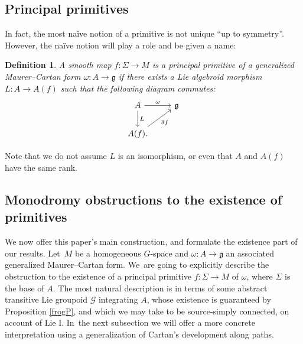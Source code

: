 \documentclass[pdftex]{sigma}%
\numberwithin{equation}{section}
\newtheorem{Definition}[Theorem]{Definition}
\begin{document}
\subsection*{Principal primitives}

In fact, the most na\"ive notion of a primitive is not unique ``up to
symmetry''. However, the na\"ive notion will play a role and be given a
name:
\begin{Definition}
 A smooth map $f \colon \Sigma \rightarrow M$ is a {\it principal
 primitive} of a generalized Maurer--Cartan form
 $\omega \colon A \rightarrow {\mathfrak g} $ if there exists a Lie
 algebroid morphism $L \colon A \rightarrow A(f)$ such that the
 following diagram commutes:
 \begin{equation}
 \begin{tikzcd} A \arrow{d}{L} \arrow{r}{\omega } & {\mathfrak g}
 \\ A(f). \arrow[swap]{ru}{\delta f} &
 \end{tikzcd}
 \label{carpet:court}
 \end{equation}
\end{Definition}
 Note that we do not assume $L $ is an isomorphism, or even
that $A$ and $A(f)$ have the same rank.

\subsection*{Monodromy obstructions to the existence of
 primitives}

We now offer this paper's main construction, and formulate the
existence part of our results. Let~$M$ be a homogeneous $G$-space and
$\omega \colon A \rightarrow {\mathfrak g} $ an associated generalized
Maurer--Cartan form. We~are going to explicitly describe the
obstruction to the existence of a principal primitive
$f \colon \Sigma \rightarrow M $ of $\omega $, where $\Sigma $ is the
base of $A$. The most natural description is in terms of some abstract
transitive Lie groupoid ${\mathcal G}$ integrating $A$, whose
existence is guaranteed by Proposition \ref{frogP}, and which we may
take to be source-simply connected, on account of Lie I. In~the next
subsection we will offer a more concrete interpretation using a
generalization of Cartan's development along paths.
\end{document}
